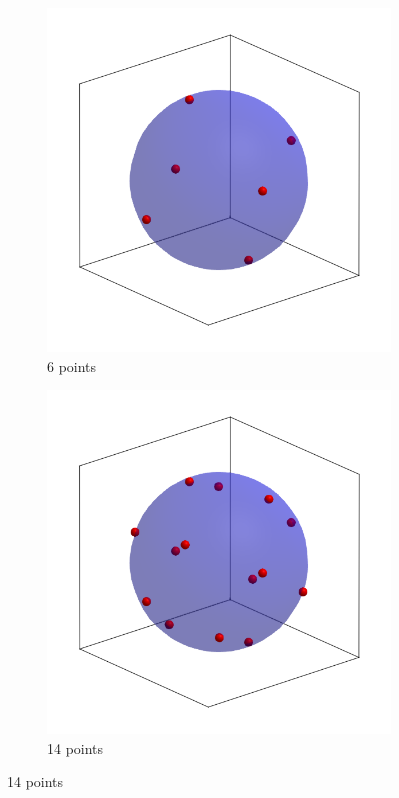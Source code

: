 \documentclass[main.tex]{subfiles}
\begin{document}
\begin{figure}
	\centering
	\begin{minipage}{0.55\linewidth}
		\begin{subfigure}{0.5\linewidth}
			\centering
			\includegraphics[width=\linewidth]{figures/gcmc/lebedev_6}
			\caption{6 points}
		\end{subfigure}%
		\begin{subfigure}{0.5\linewidth}
			\centering
			\includegraphics[width=\linewidth]{figures/gcmc/lebedev_14}
			\caption{14 points}
		\end{subfigure}


\end{minipage}
\end{figure}
\end{document}
